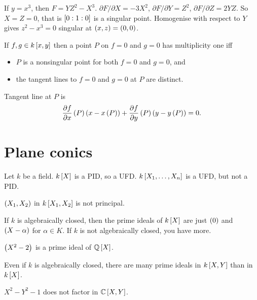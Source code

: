 \begin{example*}
If $ y = x^3 $, then $ F = YZ^2 - X^3 $. $ \partial F / \partial X = -3X^2 $, $ \partial F / \partial Y = Z^2 $, $ \partial F / \partial Z = 2YZ $. So $ X = Z = 0 $, that is $ \sb{0 : 1 : 0} $ is a singular point. Homogenise with respect to $ Y $ gives $ z^2 - x^3 = 0 $ singular at $ \rb{x, z} = \rb{0, 0} $.
\end{example*}

\begin{theorem}
\label{thm:2.10}
If $ f, g \in k\sb{x, y} $ then a point $ P $ on $ f = 0 $ and $ g = 0 $ has multiplicity one iff
\begin{itemize}
\item $ P $ is a nonsingular point for both $ f = 0 $ and $ g = 0 $, and
\item the tangent lines to $ f = 0 $ and $ g = 0 $ at $ P $ are distinct.
\end{itemize}
Tangent line at $ P $ is
$$ \dfrac{\partial f}{\partial x}\rb{P}\rb{x - x\rb{P}} + \dfrac{\partial f}{ \partial y}\rb{P}\rb{y - y\rb{P}} = 0. $$
\end{theorem}

\pagebreak

\section{Plane conics}

Let $ k $ be a field. $ k\sb{X} $ is a PID, so a UFD. $ k\sb{X_1, \dots, X_n} $ is a UFD, but not a PID.

\begin{example*}
$ \rb{X_1, X_2} $ in $ k\sb{X_1, X_2} $ is not principal.
\end{example*}

If $ k $ is algebraically closed, then the prime ideals of $ k\sb{X} $ are just $ \rb{0} $ and $ \rb{X - \alpha} $ for $ \alpha \in K $. If $ k $ is not algebraically closed, you have more.

\begin{example*}
$ \rb{X^2 - 2} $ is a prime ideal of $ \Q\sb{X} $.
\end{example*}

Even if $ k $ is algebraically closed, there are many prime ideals in $ k\sb{X, Y} $ than in $ k\sb{X} $.

\begin{example*}
$ X^2 - Y^2 - 1 $ does not factor in $ \C\sb{X, Y} $.
\end{example*}

